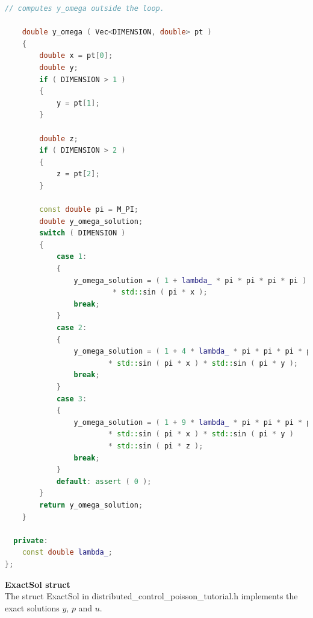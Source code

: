\documentclass[a4paper, 11pt, twoside]{article}
\begin{document}
\begin{lstlisting}[language=C++, basicstyle={\footnotesize, \ttfamily}, keywordstyle=\color{blue}, numbers=none, tabsize=4]
    // computes y_omega outside the loop.

    double y_omega ( Vec<DIMENSION, double> pt )
    {
        double x = pt[0];
        double y;
        if ( DIMENSION > 1 )
        {
            y = pt[1];
        }

        double z;
        if ( DIMENSION > 2 )
        {
            z = pt[2];
        }

        const double pi = M_PI;
        double y_omega_solution;
        switch ( DIMENSION )
        {
            case 1:
            {
                y_omega_solution = ( 1 + lambda_ * pi * pi * pi * pi )
                         * std::sin ( pi * x );
                break;
            }
            case 2:
            {
                y_omega_solution = ( 1 + 4 * lambda_ * pi * pi * pi * pi )
                        * std::sin ( pi * x ) * std::sin ( pi * y );
                break;
            }
            case 3:
            {
                y_omega_solution = ( 1 + 9 * lambda_ * pi * pi * pi * pi )
                        * std::sin ( pi * x ) * std::sin ( pi * y ) 
                        * std::sin ( pi * z );
                break;
            }
            default: assert ( 0 );
        }
        return y_omega_solution;
    }

  private:
    const double lambda_;
};
\end{lstlisting}

\textbf{ExactSol struct}\label{structExactSol}\\
The struct ExactSol in distributed\_control\_poisson\_tutorial.h implements the exact solutions  $y$, $p$ and $u$.
\end{document}
